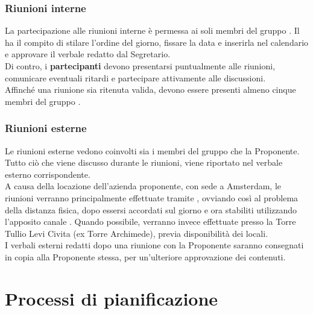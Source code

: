 \documentclass[NormeDiProgetto.tex]{subfiles}
\begin{document}
	\subsubsection{Riunioni interne}
	La partecipazione alle riunioni interne è permessa ai soli membri del gruppo \gruppo.
	Il \respdiprog ha il compito di stilare l'ordine del giorno, fissare la data e inserirla nel calendario e approvare il verbale redatto dal Segretario.\\
	Di contro, i \textbf{partecipanti} devono presentarsi puntualmente alle riunioni, comunicare eventuali ritardi e partecipare attivamente alle discussioni.\\
	Affinché una riunione sia ritenuta valida, devono essere presenti almeno cinque membri del gruppo \gruppo.
	
	\subsubsection{Riunioni esterne}
	Le riunioni esterne vedono coinvolti sia i membri del gruppo \gruppo che la Proponente.
	Tutto ciò che viene discusso durante le riunioni, viene riportato nel verbale esterno corrispondente.\\
	A causa della locazione dell'azienda proponente, con sede a Amsterdam, le riunioni verranno principalmente effettuate tramite , ovviando così al problema della distanza fisica, dopo essersi accordati sul giorno e ora stabiliti utilizzando l'apposito canale .
	Quando possibile, verranno invece effettuate presso la Torre Tullio Levi Civita (ex Torre Archimede), previa disponibilità dei locali.\\
	I verbali esterni redatti dopo una riunione con la Proponente saranno consegnati in copia alla Proponente stessa, per un'ulteriore approvazione dei contenuti.
	
	\section{Processi di pianificazione}
\end{document}
